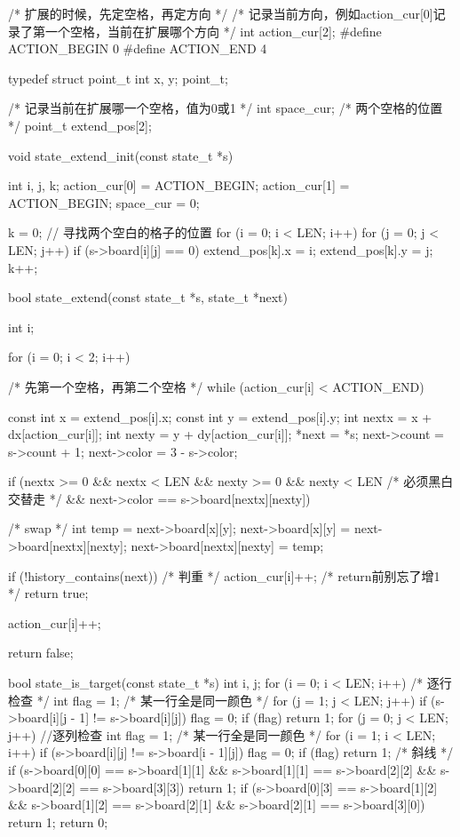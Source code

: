 \begin{Codex}[label=four_adjacent.c]
/* 扩展的时候，先定空格，再定方向 */
/* 记录当前方向，例如action_cur[0]记录了第一个空格，当前在扩展哪个方向
 */
int action_cur[2];
#define ACTION_BEGIN 0
#define ACTION_END 4

typedef struct point_t {
    int x, y;
} point_t;

/* 记录当前在扩展哪一个空格，值为0或1 */
int space_cur;
/* 两个空格的位置 */
point_t extend_pos[2];

void state_extend_init(const state_t *s) {
    int i, j, k;
    action_cur[0] = ACTION_BEGIN;
    action_cur[1] = ACTION_BEGIN;
    space_cur = 0;

    k = 0;
    // 寻找两个空白的格子的位置
    for (i = 0; i < LEN; i++) {
        for (j = 0; j < LEN; j++) {
            if (s->board[i][j] == 0) {
                extend_pos[k].x = i;
                extend_pos[k].y = j;
                k++;
            }
        }
    }
}

bool state_extend(const state_t *s, state_t *next) {
    int i;

    for (i = 0; i < 2; i++) { /* 先第一个空格，再第二个空格 */
        while (action_cur[i] < ACTION_END) {
            const int x = extend_pos[i].x;
            const int y = extend_pos[i].y;
            int nextx = x + dx[action_cur[i]];
            int nexty = y + dy[action_cur[i]];
            *next = *s;
            next->count = s->count + 1;
            next->color = 3 - s->color;

            if (nextx >= 0 && nextx < LEN && nexty >= 0 && nexty < LEN
                    /* 必须黑白交替走 */
                    && next->color == s->board[nextx][nexty]) {
                /* swap */
                {
                    int temp = next->board[x][y];
                    next->board[x][y] = next->board[nextx][nexty];
                    next->board[nextx][nexty] = temp;
                }

                if (!history_contains(next)) { /* 判重 */
                    action_cur[i]++; /* return前别忘了增1 */
                    return true;
                }
            }
            action_cur[i]++;
        }
    }
    return false;
}

bool state_is_target(const state_t *s) {
    int i, j;
    for (i = 0; i < LEN; i++) {  /* 逐行检查 */
        int flag = 1;  /* 某一行全是同一颜色 */
        for (j = 1; j < LEN; j++)
            if (s->board[i][j - 1] != s->board[i][j])
                flag = 0;
        if (flag)
            return 1;
    }
    for (j = 0; j < LEN; j++) { //逐列检查
        int flag = 1;  /* 某一行全是同一颜色 */
        for (i = 1; i < LEN; i++)
            if (s->board[i][j] != s->board[i - 1][j]) flag = 0;
        if (flag) return 1;
    }
    /* 斜线 */
    if (s->board[0][0] == s->board[1][1] && s->board[1][1] == s->board[2][2]
            && s->board[2][2] == s->board[3][3])
        return 1;
    if (s->board[0][3] == s->board[1][2] && s->board[1][2] == s->board[2][1]
            && s->board[2][1] == s->board[3][0])
        return 1;
    return 0;
}
\end{Codex}

